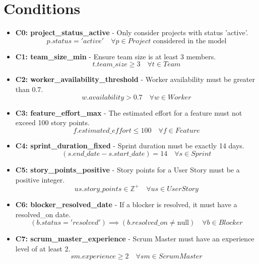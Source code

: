 \documentclass[11pt]{article}
\begin{document}
\section{Conditions}
\begin{itemize}
    \item \textbf{C0: project\_status\_active} - Only consider projects with status 'active'.
        \[ p.status = 'active' \quad \forall p \in Project \text{ considered in the model} \]
    \item \textbf{C1: team\_size\_min} - Ensure team size is at least 3 members.
        \[ t.team\_size \geq 3 \quad \forall t \in Team \]
    \item \textbf{C2: worker\_availability\_threshold} - Worker availability must be greater than 0.7.
        \[ w.availability > 0.7 \quad \forall w \in Worker \]
    \item \textbf{C3: feature\_effort\_max} - The estimated effort for a feature must not exceed 100 story points.
        \[ f.estimated\_effort \leq 100 \quad \forall f \in Feature \]
    \item \textbf{C4: sprint\_duration\_fixed} - Sprint duration must be exactly 14 days.
        \[ (s.end\_date - s.start\_date) = 14 \quad \forall s \in Sprint \]
    \item \textbf{C5: story\_points\_positive} - Story points for a User Story must be a positive integer.
        \[ us.story\_points \in \mathbb{Z}^+ \quad \forall us \in UserStory \]
    \item \textbf{C6: blocker\_resolved\_date} - If a blocker is resolved, it must have a resolved\_on date.
        \[ (b.status = 'resolved') \implies (b.resolved\_on \neq \text{null}) \quad \forall b \in Blocker \]
    \item \textbf{C7: scrum\_master\_experience} - Scrum Master must have an experience level of at least 2.
        \[ sm.experience \geq 2 \quad \forall sm \in ScrumMaster \]
\end{itemize}
\end{document}
